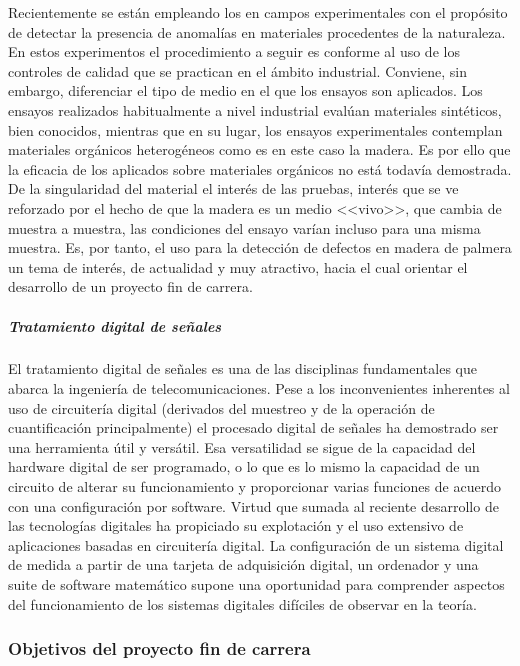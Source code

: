 Recientemente se están empleando los  en campos experimentales con el propósito de detectar la presencia de anomalías en materiales procedentes de la naturaleza. En estos experimentos el procedimiento a seguir es conforme al uso de los controles de calidad que se practican en el ámbito industrial. Conviene, sin embargo, diferenciar el tipo de medio en el que los ensayos son aplicados. Los ensayos realizados habitualmente a nivel industrial evalúan materiales sintéticos, bien conocidos, mientras que en su lugar, los ensayos experimentales contemplan materiales orgánicos heterogéneos como es en este caso la madera. Es por ello que la eficacia de los  aplicados sobre materiales orgánicos no está todavía demostrada. De la singularidad del material el interés de las pruebas, interés que se ve reforzado por el hecho de que la madera es un medio <<vivo>>, que cambia de muestra a muestra, las condiciones del ensayo varían incluso para una misma muestra. Es, por tanto, el uso  para la detección de defectos en madera de palmera un tema de interés, de actualidad y muy atractivo, hacia el cual orientar el desarrollo de un proyecto fin de carrera.


\subparagraph{Tratamiento digital de señales}

El tratamiento digital de señales es una de las disciplinas fundamentales que abarca la ingeniería de telecomunicaciones. Pese a los inconvenientes inherentes al uso de circuitería digital (derivados del muestreo y de la operación de cuantificación principalmente) el procesado digital de señales ha demostrado ser una herramienta útil y versátil. Esa versatilidad se sigue de la capacidad del hardware digital de ser programado, o lo que es lo mismo la capacidad de un circuito de alterar su funcionamiento y proporcionar varias funciones de acuerdo con una configuración por software. Virtud que sumada al reciente desarrollo de las tecnologías digitales ha propiciado su explotación y el uso extensivo de aplicaciones basadas en circuitería digital. La configuración de un sistema digital de medida a partir de una tarjeta de adquisición digital, un ordenador y una suite de software matemático supone una oportunidad para comprender aspectos del funcionamiento de los sistemas digitales difíciles de observar en la teoría.


\subsubsection{Objetivos del proyecto fin de carrera}\label{sec:goals}

